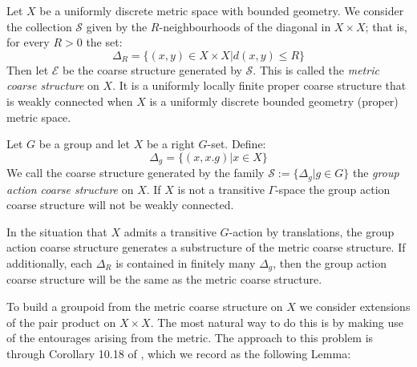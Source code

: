 \begin{example}
\begin{example}\label{ex:MCS}
Let $X$ be a uniformly discrete metric space with bounded geometry. We consider the collection $\mathcal{S}$ given by the $R$-neighbourhoods of the diagonal in $X\times X$; that is, for every $R>0$ the set:
\begin{equation*}
\Delta_{R}=\lbrace (x,y) \in X \times X | d(x,y)\leq R \rbrace
\end{equation*}
Then let $\mathcal{E}$ be the coarse structure generated by $\mathcal{S}$. This is called the \textit{metric coarse structure} on $X$. It is a uniformly locally finite proper coarse structure that is weakly connected when $X$ is a uniformly discrete bounded geometry (proper) metric space.
\end{example}

\begin{example}\label{ex:GACS}
Let $G$ be a group and let $X$ be a right $G$-set. Define:
\begin{equation*}
\Delta_{g}=\lbrace (x,x.g) | x \in X \rbrace  
\end{equation*}
We call the coarse structure generated by the family $\mathcal{S}:=\lbrace \Delta_{g} | g\in G\rbrace$ the \textit{group action coarse structure} on $X$. If $X$ is not a transitive $\Gamma$-space the group action coarse structure will not be weakly connected.
\end{example}

In the situation that $X$ admits a transitive $G$-action by translations, the group action coarse structure generates a substructure of the metric coarse structure. If additionally, each $\Delta_{R}$ is contained in finitely many $\Delta_{g}$, then the group action coarse structure will be the same as the metric coarse structure.

To build a groupoid from the metric coarse structure on $X$ we consider extensions of the pair product on $X \times X$. The most natural way to do this is by making use of the entourages arising from the metric. The approach to this problem is through Corollary 10.18 of \cite{MR2007488}, which we record as the following Lemma:


\end{example}
